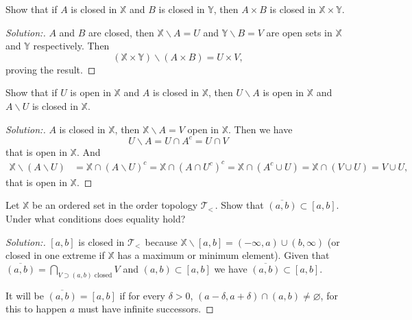 \documentclass[a4paper,12pt, reqno]{article}
\theoremstyle{definition}
\newenvironment{exerr}[1]{
  \renewcommand\theexeralt{#1}
  \exeralt
}{\endexeralt}
\newenvironment{solution}{\begin{proof}[Solution:]}{\end{proof}}
\newcommand{\T}{\mathscr{T}}
\newcommand{\X}{\mathbb{X}}
\newcommand{\Y}{\mathbb{Y}}
\begin{document}
\begin{exerr}{3}
  Show that if $A$ is closed in $\X$ and $B$ is closed in $\Y$, then $A\times B$ is closed in $\X\times\Y$.
\end{exerr}
\begin{solution}
  $A$ and $B$ are closed, then $\X\backslash A = U$ and $\Y\backslash B=V$ are open sets in $\X$ and $\Y$ respectively. Then
  \begin{equation*}
    (\X\times\Y)\backslash(A\times B) = U\times V,
  \end{equation*}
  proving the result.
\end{solution}

\begin{exerr}{4}
  Show that if $U$ is open in $\X$ and $A$ is closed in $\X$, then $U\backslash A$ is open in $\X$ and $A\backslash U$ is closed in $\X$.
\end{exerr}
\begin{solution}
  $A$ is closed in $\X$, then $\X\backslash A = V$ open in $\X$. Then we have
  \begin{equation*}
    U\backslash A = U\cap A^c = U\cap V
  \end{equation*}
  that is open in $\X$. And
  \begin{align*}
    \X\backslash(A\backslash U) & = \X\cap (A\backslash U)^c = \X\cap (A\cap U^c)^c = \X\cap (A^c\cup U) = \X\cap (V\cup U) = V\cup U,
  \end{align*}
  that is open in $\X$.
\end{solution}

\begin{exerr}{5}
  Let $\X$ be an ordered set in the order topology $\T_{<\,}$. Show that $\overline{(a,b)}\subset[a,b]$. Under what conditions does equality hold?
\end{exerr}
\begin{solution}
  $[a,b]$ is closed in $\T_{<\,}$ because $\X\backslash[a,b] = (-\infty,a)\cup(b,\infty)$ (or closed in one extreme if $\X$ has a maximum or minimum element). Given that $\overline{(a,b)} = \bigcap_{V\supset(a,b) \text{ closed}}V$ and $(a,b)\subset[a,b]$ we have $\overline{(a,b)}\subset[a,b]$.

  It will be $\overline{(a,b)} = [a,b]$ if for every $\delta>0$, $(a-\delta,a+\delta)\cap (a,b)\neq \varnothing$, for this to happen $a$ must have infinite successors.
\end{solution}
\end{document}
